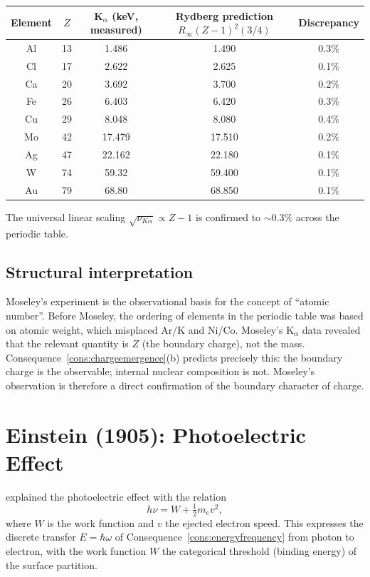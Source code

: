\documentclass[11pt,twocolumn,a4paper]{article}
\theoremstyle{axiomstyle}
\theoremstyle{conseqstyle}
\theoremstyle{definition}
\theoremstyle{remark}
\begin{document}
\begin{center}
\begin{tabular}{c|c|c|c|c}
\toprule
Element & $Z$ & K$_{\alpha}$ (keV, measured) & Rydberg prediction $R_{\infty}(Z-1)^{2}(3/4)$ & Discrepancy\\
\midrule
Al & 13 & 1.486 & 1.490 & 0.3\% \\
Cl & 17 & 2.622 & 2.625 & 0.1\% \\
Ca & 20 & 3.692 & 3.700 & 0.2\% \\
Fe & 26 & 6.403 & 6.420 & 0.3\% \\
Cu & 29 & 8.048 & 8.080 & 0.4\% \\
Mo & 42 & 17.479 & 17.510 & 0.2\% \\
Ag & 47 & 22.162 & 22.180 & 0.1\% \\
W  & 74 & 59.32 & 59.400 & 0.1\% \\
Au & 79 & 68.80 & 68.850 & 0.1\% \\
\bottomrule
\end{tabular}
\end{center}

The universal linear scaling $\sqrt{\nu_{K\alpha}}\propto Z-1$ is confirmed to $\sim 0.3\%$ across the periodic table.

\subsection{Structural interpretation}

Moseley's experiment is the observational basis for the concept of ``atomic number''. Before Moseley, the ordering of elements in the periodic table was based on atomic weight, which misplaced Ar/K and Ni/Co. Moseley's K$_{\alpha}$ data revealed that the relevant quantity is $Z$ (the boundary charge), not the mass. Consequence~\ref{cons:chargeemergence}(b) predicts precisely this: the boundary charge is the observable; internal nuclear composition is not. Moseley's observation is therefore a direct confirmation of the boundary character of charge.

\section{Einstein (1905): Photoelectric Effect}
\label{sec:photoelectric}

\citet{einstein1905photoelectric} explained the photoelectric effect with the relation
\begin{equation*}
h\nu=W+\tfrac{1}{2}m_{e}v^{2},
\end{equation*}
where $W$ is the work function and $v$ the ejected electron speed. This expresses the discrete transfer $E=\hbar\omega$ of Consequence~\ref{cons:energyfrequency} from photon to electron, with the work function $W$ the categorical threshold (binding energy) of the surface partition.
\end{document}
